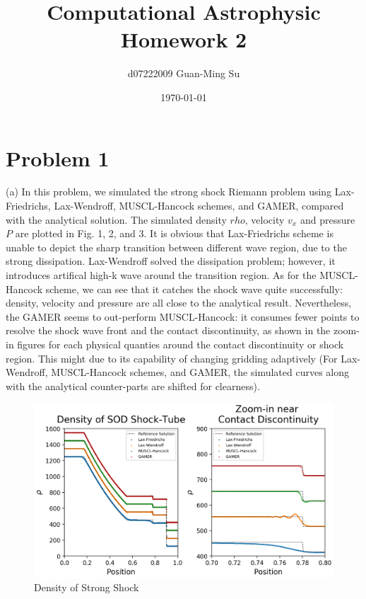 \documentclass[a4paper,10pt]{article}
\title{Computational Astrophysic\\Homework 2}
\author{d07222009 Guan-Ming Su}
\date{\today}       %
\begin{document}
\maketitle

\section*{Problem 1}
 \setlength{\parindent}{0em}(a)
In this problem, we simulated the strong shock Riemann problem using Lax-Friedrichs, Lax-Wendroff, MUSCL-Hancock schemes, and GAMER, compared with the analytical solution. The simulated density $rho$, velocity $v_x$ and pressure $P$ are plotted in Fig. 1, 2, and 3. It is obvious that Lax-Friedrichs scheme is unable to depict the sharp transition between different wave region, due to the strong dissipation. Lax-Wendroff solved the dissipation problem; however, it introduces artifical high-k wave around the transition region. As for the MUSCL-Hancock scheme, we can see that it catches the shock wave quite successfully: density, velocity and pressure are all close to the analytical result. Nevertheless, the GAMER seems to out-perform MUSCL-Hancock: it consumes fewer points to resolve the shock wave front and the contact discontinuity, as shown in the zoom-in figures for each physical quanties around the contact discontinuity or shock region. This might due to its capability of changing gridding adaptively (For Lax-Wendroff, MUSCL-Hancock schemes, and GAMER, the simulated curves along with the analytical counter-parts are shifted for clearness).
\begin{figure}[htbp] %
\centering %
\includegraphics[width=15cm]{density_1-1.png} %
\caption{Density of Strong Shock}
\end{figure}
\end{document}

